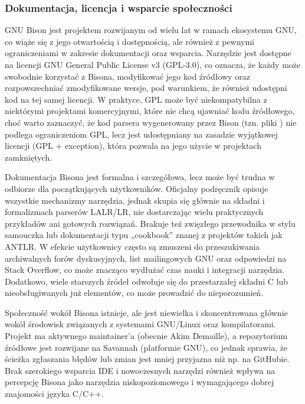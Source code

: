 \documentclass[12pt,twoside]{article}
\begin{document}
\subsubsection{Dokumentacja, licencja i wsparcie społeczności}
GNU Bison jest projektem rozwijanym od wielu lat w ramach ekosystemu GNU, co wiąże się z jego otwartością i dostępnością, ale również z pewnymi ograniczeniami w zakresie dokumentacji oraz wsparcia. Narzędzie jest dostępne na licencji GNU General Public License v3 (GPL-3.0), co oznacza, że każdy może swobodnie korzystać z Bisona, modyfikować jego kod źródłowy oraz rozpowszechniać zmodyfikowane wersje, pod warunkiem, że również udostępni kod na tej samej licencji. W praktyce, GPL może być niekompatybilna z niektórymi projektami komercyjnymi, które nie chcą ujawniać kodu źródłowego, choć warto zaznaczyć, że kod parsera wygenerowany przez Bison (tzn. pliki ) nie podlega ograniczeniom GPL, lecz jest udostępniany na zasadzie wyjątkowej licencji (GPL + exception), która pozwala na jego użycie w projektach zamkniętych. \cite{biosonOrg}

Dokumentacja Bisona jest formalna i szczegółowa, lecz może być trudna w odbiorze dla początkujących użytkowników. Oficjalny podręcznik opisuje wszystkie mechanizmy narzędzia, jednak skupia się głównie na składni i formalizmach parserów LALR/LR, nie dostarczając wielu praktycznych przykładów ani gotowych rozwiązań. Brakuje też zwięzłego przewodnika w stylu samouczka lub dokumentacji typu „cookbook” znanej z projektów takich jak ANTLR. W efekcie użytkownicy często są zmuszeni do przeszukiwania archiwalnych forów dyskusyjnych, list mailingowych GNU oraz odpowiedzi na Stack Overflow, co może znacząco wydłużać czas nauki i integracji narzędzia. Dodatkowo, wiele starszych źródeł odwołuje się do przestarzałej składni C lub nieobsługiwanych już elementów, co może prowadzić do nieporozumień.

Społeczność wokół Bisona istnieje, ale jest niewielka i skoncentrowana głównie wokół środowisk związanych z systemami GNU/Linux oraz kompilatorami. Projekt ma aktywnego maintainer'a (obecnie Akim Demaille), a repozytorium źródłowe jest rozwijane na Savannah (platformie GNU), co jednak sprawia, że ścieżka zgłaszania błędów lub zmian jest mniej przyjazna niż np. na GitHubie. Brak szerokiego wsparcia IDE i nowoczesnych narzędzi również wpływa na percepcję Bisona jako narzędzia niskopoziomowego i wymagającego dobrej znajomości języka C/C++.
\end{document}
